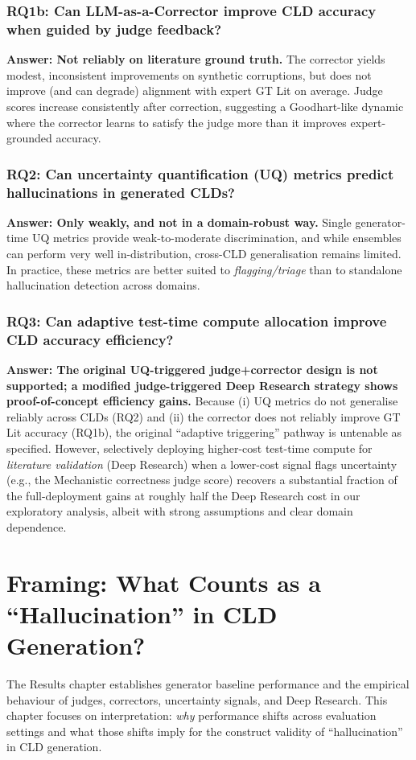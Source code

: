 \subsubsection*{RQ1b: Can LLM-as-a-Corrector improve CLD accuracy when guided by judge feedback?}
\textbf{Answer: Not reliably on literature ground truth.} The corrector yields modest, inconsistent improvements on synthetic corruptions, but does not improve (and can degrade) alignment with expert GT Lit on average. Judge scores increase consistently after correction, suggesting a Goodhart-like dynamic where the corrector learns to satisfy the judge more than it improves expert-grounded accuracy.

\subsubsection*{RQ2: Can uncertainty quantification (UQ) metrics predict hallucinations in generated CLDs?}
\textbf{Answer: Only weakly, and not in a domain-robust way.} Single generator-time UQ metrics provide weak-to-moderate discrimination, and while ensembles can perform very well in-distribution, cross-CLD generalisation remains limited. In practice, these metrics are better suited to \textit{flagging/triage} than to standalone hallucination detection across domains.

\subsubsection*{RQ3: Can adaptive test-time compute allocation improve CLD accuracy efficiency?}
\textbf{Answer: The original UQ-triggered judge+corrector design is not supported; a modified judge-triggered Deep Research strategy shows proof-of-concept efficiency gains.} Because (i) UQ metrics do not generalise reliably across CLDs (RQ2) and (ii) the corrector does not reliably improve GT Lit accuracy (RQ1b), the original ``adaptive triggering'' pathway is untenable as specified. However, selectively deploying higher-cost test-time compute for \textit{literature validation} (Deep Research) when a lower-cost signal flags uncertainty (e.g., the Mechanistic correctness judge score) recovers a substantial fraction of the full-deployment gains at roughly half the Deep Research cost in our exploratory analysis, albeit with strong assumptions and clear domain dependence.

\section{Framing: What Counts as a ``Hallucination'' in CLD Generation?}
\label{sec:discussion_framing}
The Results chapter establishes generator baseline performance and the empirical behaviour of judges, correctors, uncertainty signals, and Deep Research. This chapter focuses on interpretation: \emph{why} performance shifts across evaluation settings and what those shifts imply for the construct validity of ``hallucination'' in CLD generation.

